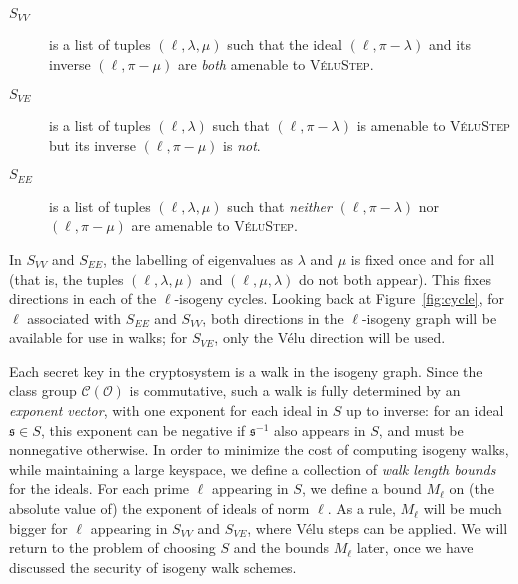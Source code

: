 \documentclass{llncs}
\newcommand{\Cl}{\mathcal{C}}
\renewcommand{\O}{\mathcal{O}}
\newcommand{\algstyle}[1]{\textsc{#1}}
\renewcommand{\frak}{\mathfrak}
\begin{document}
\begin{description}
    \item[$S_{VV}$]
        \label{case:velustep-sym}
        is a list of tuples $(\ell,\lambda,\mu)$
        such that the ideal $(\ell,\pi - \lambda)$ 
        and its inverse $(\ell,\pi-\mu)$
        are \emph{both} amenable to \algstyle{VéluStep}.
    \item[$S_{VE}$]
        \label{case:velustep-asym}
        is a list of tuples $(\ell,\lambda)$
        such that $(\ell,\pi-\lambda)$ is amenable to
        \algstyle{VéluStep} but its inverse $(\ell,\pi-\mu)$ is \emph{not}.
    \item[$S_{EE}$]
        \label{case:elkstep} 
        is a list of tuples $(\ell,\lambda,\mu)$
        such that \emph{neither} $(\ell,\pi - \lambda)$ nor $(\ell,\pi-\mu)$
        are amenable to \algstyle{VéluStep}.
\end{description}

In $S_{VV}$ and $S_{EE}$,
the labelling of eigenvalues as $\lambda$ and $\mu$ 
is fixed once and for all 
(that is, the tuples $(\ell,\lambda,\mu)$ and $(\ell,\mu,\lambda)$ do not
both appear).
This fixes directions in each of the $\ell$-isogeny cycles.
Looking back at Figure~\ref{fig:cycle}, 
for $\ell$ associated with $S_{EE}$ and $S_{VV}$, 
both directions in the $\ell$-isogeny graph will be available for use in
walks; for $S_{VE}$, only the Vélu direction will be used.

Each secret key in the cryptosystem is a walk in the isogeny graph.
Since the class group $\Cl(\O)$ is commutative, such a walk is fully
determined by an \emph{exponent vector}, with one exponent for each ideal in $S$
up to inverse: for an ideal $\frak s\in S$, this exponent can be negative if
$\frak s^{-1}$ also appears in $S$, and must be nonnegative otherwise.
In order to minimize the cost of computing isogeny walks, 
while maintaining a large keyspace,
we define a collection of \emph{walk length bounds} for the ideals.
For each prime $\ell$ appearing in $S$, we define a bound $M_\ell$
on (the absolute value of) the exponent of ideals of norm $\ell$.
As a rule, $M_\ell$ will be much bigger for $\ell$
appearing in $S_{VV}$ and $S_{VE}$, where Vélu steps can be applied.
We will return to the problem of choosing $S$ and the bounds $M_\ell$ later,
once we have discussed the security of isogeny walk schemes.
\end{document}

